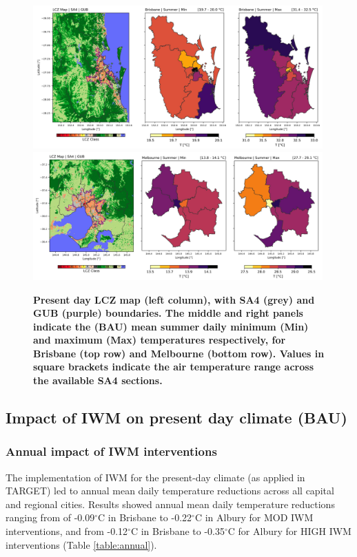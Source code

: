 \documentclass[utf8]{frontiersSCNS} %
\begin{document}
\begin{figure}
\centering
\includegraphics[width=0.99\textwidth]{images/image8.jpg}
\includegraphics[width=0.99\textwidth]{images/image9.jpg}
\caption{\bf Present day LCZ map (left column), with SA4 (grey) and GUB (purple) boundaries. The middle and right panels indicate the (BAU) mean summer daily minimum (Min) and maximum (Max) temperatures respectively, for Brisbane (top row) and Melbourne (bottom row). Values in square brackets indicate the air temperature range across the available SA4 sections.}
 \label{fig:lczsa4}
\end{figure}

\subsection{Impact of IWM on present day climate (BAU)}\label{sec:results2}
\subsubsection{Annual impact of IWM interventions}\label{sec:results2a}
The implementation of IWM for the present-day climate (as applied in TARGET) led to annual mean daily temperature reductions across all capital and regional cities. Results showed annual mean daily temperature reductions ranging from of -0.09$^{\circ}$C in Brisbane to -0.22$^{\circ}$C in Albury for MOD IWM interventions, and from -0.12$^{\circ}$C in Brisbane to -0.35$^{\circ}$C for Albury for HIGH IWM interventions (Table \ref{table:annual}). 
\end{document}
